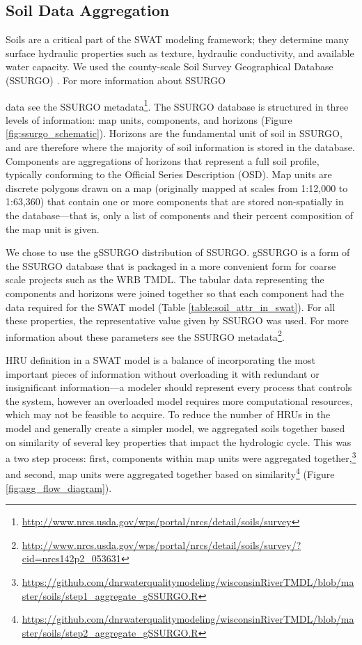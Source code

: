 \subsection{Soil Data Aggregation}\label{sec:soils}

Soils are a critical part of the SWAT modeling framework; they determine many
surface hydraulic properties such as texture, hydraulic conductivity, and
available water capacity. We used the county-scale Soil Survey Geographical
Database (SSURGO) . For more information about SSURGO

data see the SSURGO metadata\footnote{\url{http://www.nrcs.usda.gov/wps/portal/nrcs/detail/soils/survey}}.
The SSURGO database is structured in three levels of information: map units,
components, and horizons (Figure \ref{fig:ssurgo_schematic}). Horizons are the fundamental unit of soil in SSURGO, and are
therefore where the majority of soil information is stored in the database.
Components are aggregations of horizons that represent a full soil profile,
typically conforming to the Official Series Description (OSD). Map units
are discrete polygons drawn on a map (originally mapped at scales from 1:12,000
to 1:63,360) that contain one or more components that are stored non-spatially
in the database---that is, only a list of components and their percent
composition of the map unit is given. 

We chose to use the gSSURGO distribution of SSURGO. gSSURGO is a form of the SSURGO database that is packaged in a more convenient form for coarse scale projects such as the WRB TMDL. The tabular data representing the components and
horizons were joined together so that each component had the data required for
the SWAT model (Table \ref{table:soil_attr_in_swat}). For all these properties, the representative value given by
SSURGO was used. For more information about these parameters see the SSURGO
metadata\footnote{\url{http://www.nrcs.usda.gov/wps/portal/nrcs/detail/soils/survey/?cid=nrcs142p2_053631}}.

HRU definition in a SWAT model is a balance of incorporating the most important
pieces of information without overloading it with redundant or insignificant
information---a modeler should represent every process that controls the system,
however an overloaded model requires more computational resources, which may not
be feasible to acquire. To reduce the number of HRUs in the model and generally create a 
simpler model, we aggregated
soils together based on similarity of several key properties that impact the
hydrologic cycle. This was a two step process: first, components within map
units were aggregated
together,\footnote{\url{https://github.com/dnrwaterqualitymodeling/wisconsinRiverTMDL/blob/master/soils/step1_aggregate_gSSURGO.R} } 
and second, map units were aggregated together based on
similarity\footnote{\url{https://github.com/dnrwaterqualitymodeling/wisconsinRiverTMDL/blob/master/soils/step2_aggregate_gSSURGO.R}} (Figure \ref{fig:agg_flow_diagram}).

